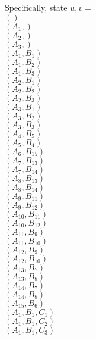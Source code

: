 \documentclass[14pt]{article}
\begin{document}
    Specifically, state $ u, v = $ \\ 
    $() $ \\ 
    $({A}_{1},) $ \\ 
    $({A}_{2},) $ \\ 
    $({A}_{3},) $ \\ 
    $({A}_{1}, {B}_{1}) $ \\ 
    $({A}_{1}, {B}_{2}) $ \\ 
    $({A}_{1}, {B}_{3}) $ \\ 
    $({A}_{2}, {B}_{1}) $ \\ 
    $({A}_{2}, {B}_{2}) $ \\ 
    $({A}_{2}, {B}_{3}) $ \\ 
    $({A}_{3}, {B}_{1}) $ \\ 
    $({A}_{3}, {B}_{2}) $ \\ 
    $({A}_{3}, {B}_{3}) $ \\ 
    $({A}_{4}, {B}_{5}) $ \\ 
    $({A}_{5}, {B}_{4}) $ \\ 
    $({A}_{6}, {B}_{15}) $ \\ 
    $({A}_{7}, {B}_{13}) $ \\ 
    $({A}_{7}, {B}_{14}) $ \\ 
    $({A}_{8}, {B}_{13}) $ \\ 
    $({A}_{8}, {B}_{14}) $ \\ 
    $({A}_{9}, {B}_{11}) $ \\ 
    $({A}_{9}, {B}_{12}) $ \\ 
    $({A}_{10}, {B}_{11}) $ \\ 
    $({A}_{10}, {B}_{12}) $ \\ 
    $({A}_{11}, {B}_{9}) $ \\ 
    $({A}_{11}, {B}_{10}) $ \\ 
    $({A}_{12}, {B}_{9}) $ \\ 
    $({A}_{12}, {B}_{10}) $ \\ 
    $({A}_{13}, {B}_{7}) $ \\ 
    $({A}_{13}, {B}_{8}) $ \\ 
    $({A}_{14}, {B}_{7}) $ \\ 
    $({A}_{14}, {B}_{8}) $ \\ 
    $({A}_{15}, {B}_{6}) $ \\ 
    $({A}_{1}, {B}_{1}, {C}_{1}) $ \\ 
    $({A}_{1}, {B}_{1}, {C}_{2}) $ \\ 
    $({A}_{1}, {B}_{1}, {C}_{3}) $ \\ 
\end{document}
